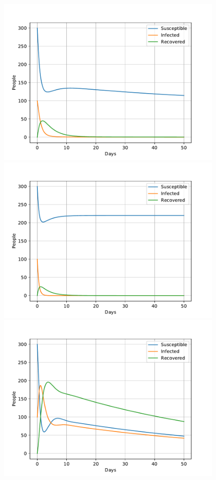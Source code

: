 \documentclass[a4paper]{article}
\begin{document}
\begin{figure}[!htb]
	\centering 
	\includegraphics[scale=0.56]{../plots/opp_c_k0.pdf}
	\includegraphics[scale=0.56]{../plots/opp_c_k1.pdf}
	\includegraphics[scale=0.56]{../plots/opp_c_k2.pdf}

\end{figure}
\end{document}
